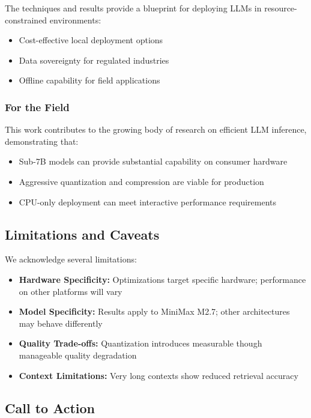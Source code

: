 The techniques and results provide a blueprint for deploying LLMs in resource-constrained environments:

\begin{itemize}
    \item Cost-effective local deployment options
    \item Data sovereignty for regulated industries
    \item Offline capability for field applications
\end{itemize}

\subsubsection{For the Field}

This work contributes to the growing body of research on efficient LLM inference, demonstrating that:

\begin{itemize}
    \item Sub-7B models can provide substantial capability on consumer hardware
    \item Aggressive quantization and compression are viable for production
    \item CPU-only deployment can meet interactive performance requirements
\end{itemize}

\subsection{Limitations and Caveats}

We acknowledge several limitations:

\begin{itemize}
    \item \textbf{Hardware Specificity:} Optimizations target specific hardware; performance on other platforms will vary
    \item \textbf{Model Specificity:} Results apply to MiniMax M2.7; other architectures may behave differently
    \item \textbf{Quality Trade-offs:} Quantization introduces measurable though manageable quality degradation
    \item \textbf{Context Limitations:} Very long contexts show reduced retrieval accuracy
\end{itemize}

\subsection{Call to Action}

